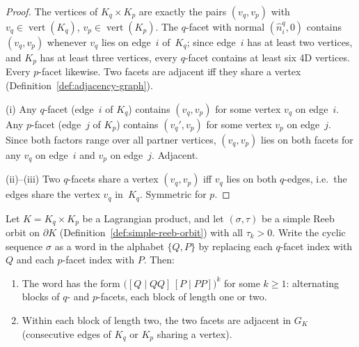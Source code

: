 \begin{proof}
The vertices of $K_q \times K_p$ are exactly the pairs
$(v_q, v_p)$ with $v_q \in \operatorname{vert}(K_q)$,
$v_p \in \operatorname{vert}(K_p)$.
The $q$-facet with normal $(\hat{n}_i^q, 0)$ contains
$(v_q, v_p)$ whenever $v_q$ lies on edge~$i$ of~$K_q$;
since edge~$i$ has at least two vertices, and $K_p$ has at
least three vertices, every $q$-facet contains at least six
4D vertices. Every $p$-facet likewise.
Two facets are adjacent iff they share a vertex
(Definition~\ref{def:adjacency-graph}).

(i) Any $q$-facet (edge~$i$ of $K_q$) contains $(v_q, v_p)$
for some vertex $v_q$ on edge~$i$. Any $p$-facet (edge~$j$
of $K_p$) contains $(v_q', v_p)$ for some vertex $v_p$ on
edge~$j$. Since both factors range over all partner vertices,
$(v_q, v_p)$ lies on both facets for any $v_q$ on edge~$i$
and $v_p$ on edge~$j$. Adjacent.

(ii)--(iii) Two $q$-facets share a vertex $(v_q, v_p)$ iff
$v_q$ lies on both $q$-edges, i.e.\ the edges share the
vertex $v_q$ in~$K_q$. Symmetric for $p$.
\end{proof}

\begin{lemma}\label{lem:sigma-structure}
Let $K = K_q \times K_p$ be a Lagrangian product, and let
$(\sigma, \tau)$ be a simple Reeb orbit on $\partial K$
(Definition~\ref{def:simple-reeb-orbit}) with all $\tau_k > 0$.
Write the cyclic sequence $\sigma$ as a word in the alphabet
$\{Q, P\}$ by replacing each $q$-facet index with $Q$ and each
$p$-facet index with $P$.
Then:
\begin{enumerate}
\item[(i)] The word has the form
  $\bigl([Q \mid QQ]\,[P \mid PP]\bigr)^k$ for some $k \geq 1$:
  alternating blocks of $q$- and $p$-facets, each block of length
  one or two.

\item[(ii)] Within each block of length two, the two facets are
  adjacent in $G_K$
  (consecutive edges of $K_q$ or $K_p$ sharing a vertex).
\end{enumerate}
\end{lemma}

